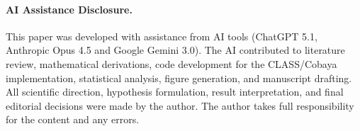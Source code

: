 \documentclass[a4paper,11pt]{article}
\begin{document}
\paragraph{AI Assistance Disclosure.}
This paper was developed with assistance from AI tools (ChatGPT 5.1, Anthropic Opus 4.5 and Google Gemini 3.0). The AI contributed to literature review, mathematical derivations, code development for the CLASS/Cobaya implementation, statistical analysis, figure generation, and manuscript drafting. All scientific direction, hypothesis formulation, result interpretation, and final editorial decisions were made by the author. The author takes full responsibility for the content and any errors.

\end{document}
